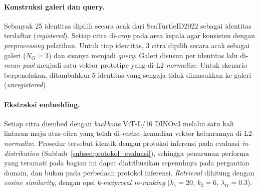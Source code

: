 \paragraph{Konstruksi galeri dan query.} Sebanyak 25 identitas dipilih secara acak dari
SeaTurtleID2022 sebagai identitas terdaftar (\textit{registered}). Setiap citra
di-\textit{crop} pada area kepala agar konsisten dengan \textit{preprocessing}
pelatihan. Untuk tiap identitas, 3 citra dipilih secara acak sebagai galeri ($N_G=3$) dan
sisanya menjadi \textit{query}. Galeri disusun per identitas lalu di-\textit{mean-pool}
menjadi satu vektor prototipe yang di-L2-\textit{normalize}. Untuk skenario berpenolakan,
ditambahkan 5 identitas yang sengaja tidak dimasukkan ke galeri (\textit{unregistered}).

\paragraph{Ekstraksi embedding.} Setiap citra diembed dengan \textit{backbone}
ViT-L/16 DINOv3 melalui satu kali lintasan maju atas citra yang telah di-\textit{resize},
kemudian vektor keluarannya di-L2-\textit{normalize}. Prosedur tersebut identik dengan
protokol inferensi pada evaluasi \textit{in-distribution} (Subbab~\ref{subsec:protokol_evaluasi}),
sehingga penurunan performa yang teramati pada bagian ini dapat diatribusikan sepenuhnya
pada pergantian domain, dan bukan pada perbedaan protokol inferensi. \textit{Retrieval}
dihitung dengan \textit{cosine similarity}, dengan opsi \textit{k-reciprocal re-ranking}
($k_1{=}20$, $k_2{=}6$, $\lambda_{\text{rr}}{=}0{.}3$).

